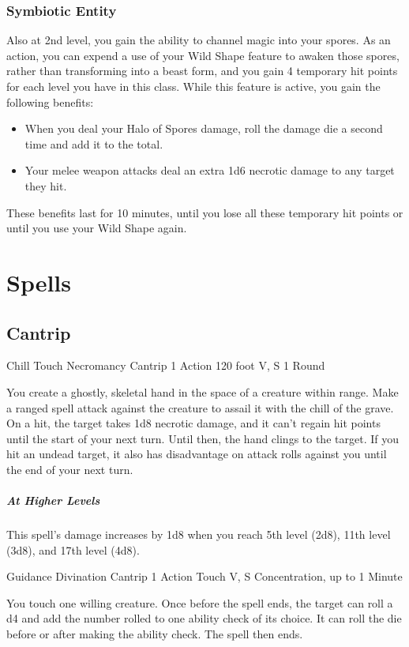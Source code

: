{\subsubsection*{Symbiotic Entity}
Also at 2nd level, you gain the ability to channel magic into your spores. As an action, you can expend a use of your Wild Shape feature to awaken those spores, rather than transforming into a beast form, and you gain 4 temporary hit points for each level you have in this class. While this feature is active, you gain the following benefits:
\begin{itemize}
	\item When you deal your Halo of Spores damage, roll the damage die a second time and add it to the total.
	\item Your melee weapon attacks deal an extra 1d6 necrotic damage to any target they hit.
\end{itemize}
These benefits last for 10 minutes, until you lose all these temporary hit points or until you use your Wild Shape again.

\section*{Spells}
\subsection*{Cantrip}

\DndSpellHeader
  {Chill Touch}
  {Necromancy Cantrip}
  {1 Action}
  {120 foot}
  {V, S}
  {1 Round}

You create a ghostly, skeletal hand in the space of a creature within range. Make a ranged spell attack against the creature to assail it with the chill of the grave. On a hit, the target takes 1d8 necrotic damage, and it can’t regain hit points until the start of your next turn. Until then, the hand clings to the target. If you hit an undead target, it also has disadvantage on attack rolls against you until the end of your next turn.

\subparagraph*{At Higher Levels} This spell's damage increases by 1d8 when you reach 5th level (2d8), 11th level (3d8), and 17th level (4d8).

\DndSpellHeader
  {Guidance}
  {Divination Cantrip}
  {1 Action}
  {Touch}
  {V, S}
  {Concentration, up to 1 Minute}

You touch one willing creature. Once before the spell ends, the target can roll a d4 and add the number rolled to one ability check of its choice. It can roll the die before or after making the ability check. The spell then ends.

}
